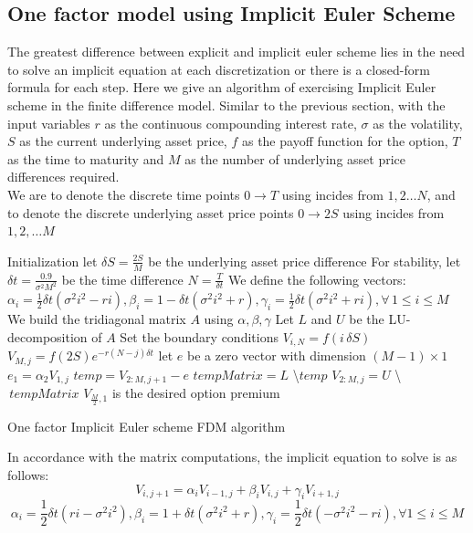 \subsection{One factor model using Implicit Euler Scheme}
The greatest difference between explicit and implicit euler scheme lies in the need to solve an implicit equation at each discretization or there is a closed-form formula for each step.
Here we give an algorithm of exercising Implicit Euler scheme in the finite difference model. Similar to the previous section, with the input variables $r$ as the continuous compounding interest rate, $\sigma$ as the volatility, $S$ as the current underlying asset price, $f$ as the payoff function for the option, $T$ as the time to maturity and $M$ as the number of underlying asset price differences required.\\
We are to denote the discrete time points $0 \to T$ using incides from $1,2 \dots N$, and to denote the discrete underlying asset price points $0 \to 2S$ using incides from $1,2, \dots M$\\[2mm]
\begin{algorithm}[H]
 Initialization\;
 let $\delta S = \frac{2S}{M}$ be the underlying asset price difference \;
 For stability, let $\delta t = \frac{0.9}{\sigma^{2}M^{2}}$ be the time difference\;
 $N = \frac{T}{\delta t}$\;
 We define the following vectors:\\
 $\alpha_{i} = \frac{1}{2}\delta t(\sigma^{2}i^{2} - ri), \beta_{i} = 1-\delta t(\sigma^{2}i^{2} + r), \gamma_{i} = \frac{1}{2}\delta t(\sigma^{2}i^{2} + ri), \forall \, 1 \le i \le M$\;
 We build the tridiagonal matrix $A$ using $\alpha, \beta, \gamma$\;
 Let $L$ and $U$ be the LU-decomposition of $A$\;
 Set the boundary conditions\;
  {
  $V_{i, N} = f(i\,\delta S)$\;
 }
  {
  $V_{M, j} = f(2S)e^{-r(N-j)\delta t}$\;
 }
 let $e$ be a zero vector with dimension $(M-1) \times 1$\;
  {
  $e_{1} = \alpha_{2} V_{1, j}$\;
  $temp =  V_{2:M, j+1} - e$\;
  $tempMatrix =  L$ \textbackslash $temp$\;
  $V_{2:M, j} = U$ \textbackslash $\,tempMatrix$\;
 }
 $V_{\frac{M}{2},1}$ is the desired option premium\;
\caption{One factor Implicit Euler scheme FDM algorithm}
\end{algorithm}
In accordance with the matrix computations, the implicit equation to solve is as follows:
$$V_{i, j+1} = \alpha_{i}V_{i-1,j} + \beta_{i}V_{i,j} + \gamma_{i}V_{i+1,j}$$
$$\alpha_{i} = \frac{1}{2}\delta t(ri-\sigma^{2}i^{2}), \beta_{i} = 1+\delta t(\sigma^{2}i^{2} + r), \gamma_{i} = \frac{1}{2}\delta t(-\sigma^{2}i^{2} - ri), \forall 1 \le i \le M$$
\newpage

